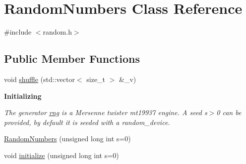 \hypertarget{classRandomNumbers}{}\section{Random\+Numbers Class Reference}
\label{classRandomNumbers}


{\ttfamily \#include $<$random.\+h$>$}

\subsection*{Public Member Functions}
\begin{DoxyCompactItemize}
\item 
void \mbox{\hyperlink{classRandomNumbers_a851aaa7e46922dc22ce984b21b474a4e}{shuffle}} (std\+::vector$<$ size\+\_\+t $>$ \&\+\_\+v)
\end{DoxyCompactItemize}
\begin{Indent}\textbf{ Initializing}\par
{\em The generator \mbox{\hyperlink{classRandomNumbers_a15ceee85d6d00de12ae76c90aaec2f14}{rng}} is a Mersenne twister {\itshape mt19937} engine. A seed {\itshape s$>$0} can be provided, by default it is seeded with a {\itshape random\+\_\+device}. }\begin{DoxyCompactItemize}
\item 
\mbox{\hyperlink{classRandomNumbers_aeceac66b253ad00f58e7b2252f18f609}{Random\+Numbers}} (unsigned long int s=0)
\item 
void \mbox{\hyperlink{classRandomNumbers_a9ee407185ec3f4e1a165edadb42c38e6}{initialize}} (unsigned long int s=0)
\end{DoxyCompactItemize}
\end{Indent}
